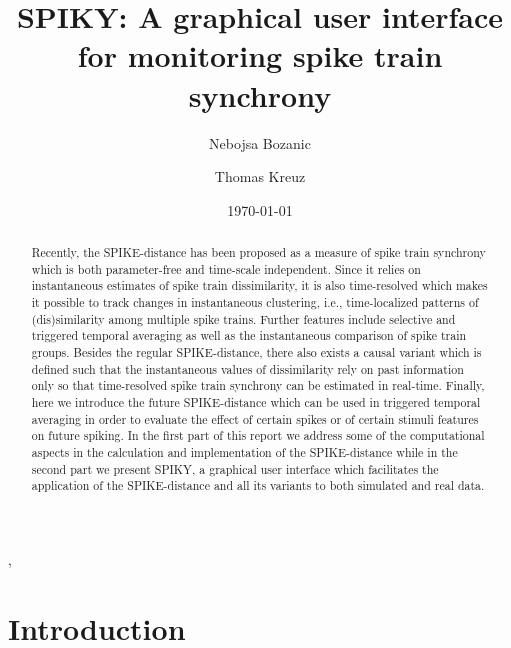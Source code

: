 \documentclass[10pt,twocolumn]{elsart5p}
\begin{document}
\begin{frontmatter}

\title{SPIKY: A graphical user interface for monitoring spike train synchrony}

\author{Nebojsa Bozanic},
\author{Thomas Kreuz}


\address{Institute for complex systems, CNR, Sesto Fiorentino, Italy}


\date{\today}

\begin{abstract}
    Recently, the SPIKE-distance has been proposed as a measure of spike train synchrony which is both parameter-free and time-scale independent. Since it relies on instantaneous estimates of spike train dissimilarity, it is also time-resolved which makes it possible to track changes in instantaneous clustering, i.e., time-localized patterns of (dis)similarity among multiple spike trains. Further features include selective and triggered temporal averaging as well as the instantaneous comparison of spike train groups. Besides the regular SPIKE-distance, there also exists a causal variant which is defined such that the instantaneous values of dissimilarity rely on past information only so that time-resolved spike train synchrony can be estimated in real-time. Finally, here we introduce the future SPIKE-distance which can be used in triggered temporal averaging in order to evaluate the effect of certain spikes or of certain stimuli features on future spiking. In the first part of this report we address some of the computational aspects in the calculation and implementation of the SPIKE-distance while in the second part we present SPIKY, a graphical user interface which facilitates the application of the SPIKE-distance and all its variants to both simulated and real data.
\end{abstract}



\end{frontmatter}

\newcommand{\abb}{\small\sf}

%
%
\section{\label{s:Intro} Introduction}
\end{document}
